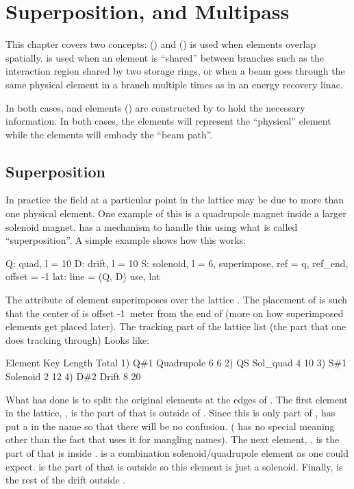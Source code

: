 \chapter{Superposition, and Multipass}
\label{c:super.multi}

This chapter covers two concepts:  ()
and  ()  is used
when elements overlap spatially.   is used when an
element is ``shared'' between branches such as the interaction region
shared by two storage rings, or when a beam goes through the same
physical element in a branch multiple times as in an energy recovery
linac.

In both cases,  and  elements ()
are constructed by \bmad to hold the necessary information. In both
cases, the  elements will represent the ``physical'' element
while the  elements will embody the ``beam path''.

\section{Superposition}
\label{s:super}

In practice the field at a particular point in the lattice may be due
to more than one physical element. One example of this is a quadrupole
magnet inside a larger solenoid magnet. \bmad has a mechanism to
handle this using what is called ``superposition''. A
simple example shows how this works:
\begin{example}
  Q: quad, l = 10
  D: drift, l = 10
  S: solenoid, l = 6, superimpose, ref = q, ref_end, offset = -1
  lat: line = (Q, D)
  use, lat
\end{example}
The  attribute of element  superimposes 
over the lattice . The placement of  is such that the
center of  is offset -1~meter from the end of  (more on how
superimposed elements get placed later). The tracking part of the
lattice list (the part that one does tracking through) Looks like:
\begin{example}
        Element   Key         Length  Total     
  1)    Q{\#}1       Quadrupole   6        6
  2)    Q{\B}S       Sol_quad     4       10
  3)    S{\#}1       Solenoid     2       12
  4)    D{\#}2       Drift        8       20
\end{example}
What \bmad has done is to split the original elements  at
the edges of . The first element in the lattice, , is
the part of  that is outside of . Since this is only part
of , \bmad has put a  in the name so that there will be
no confusion. (\vn{\#} has no special meaning other than the fact
that \bmad uses it for mangling names). The next element, ,
is the part of  that is inside .  is a
combination solenoid/quadrupole element as one could
expect.  is the part of  that is outside  so
this element is just a solenoid. Finally,  is the rest of the
drift outside .

